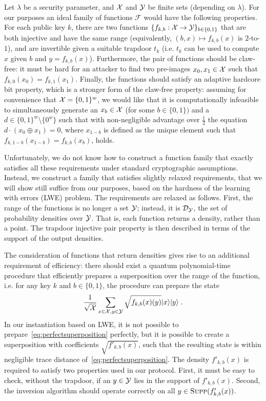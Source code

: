 
Let $\lambda$ be a security parameter, and $\mathcal{X}$ and $\mathcal{Y}$ be finite sets (depending on $\lambda$). For our purposes an ideal family of functions $\mathcal{F}$ would have the following properties. For each public key $k$, there are two functions $ \{f_{k,b}:\mathcal{X}\rightarrow \mathcal{Y}\}_{b\in\{0,1\}}$ that are both injective and have the same range (equivalently, $(b,x)\mapsto f_{k,b}(x)$ is $2$-to-$1$), and are invertible given a suitable trapdoor $t_k$ (i.e. $t_k$ can be used to compute $x$ given $b$ and $y=f_{k,b}(x)$). Furthermore, the pair of functions should be claw-free: it must be hard for an attacker to find two pre-images $x_0,x_1\in\mathcal{X}$ such that $f_{k,0}(x_0) = f_{k,1}(x_1)$. Finally, the functions should satisfy an adaptive hardcore bit property, which is a stronger form of the claw-free property: assuming for convenience that $\mathcal{X}= \{0,1\}^w$, we would like that it is computationally infeasible to simultaneously generate an $x_b\in\mathcal{X}$ (for some $b\in\{0,1\})$ and a $d\in \{0,1\}^w\setminus \{0^w\}$ such that with non-negligible advantage over $\frac{1}{2}$ the equation $d\cdot (x_0\oplus x_1)=0$, where $x_{1-b}$ is defined as the unique element such that $f_{k,1-b}(x_{1-b})=f_{k,b}(x_b)$, holds.  


Unfortunately, we do not know how to construct a function family that exactly satisfies all these requirements under standard cryptographic assumptions. Instead, we  construct a family that satisfies slightly relaxed requirements, that we will show still suffice from our purposes, based on the hardness of the learning with errors (LWE) problem. The requirements are relaxed as follows. First, the range of the functions is no longer a set $\mathcal{Y}$; instead, it is  $\mathcal{D}_{\mathcal{Y}}$, the set of probability densities over $\mathcal{Y}$. That is, each function returns a density, rather than a point. The trapdoor injective pair property is then described in terms of the support of the output densities. 

The consideration of functions that return densities gives rise to an additional requirement of efficiency: there should exist a quantum polynomial-time procedure that efficiently prepares a superposition over the range of the function, i.e. for any key $k$ and $b\in\{0,1\}$, the procedure can prepare the state
\begin{equation}\label{eq:perfectsuperposition}
\frac{1}{\sqrt{\mathcal{X}}}\sum_{x\in \mathcal{X}, y\in \mathcal{Y}}\sqrt{f_{k,b}(x)(y)}|x\rangle|y\rangle\;.
\end{equation}
In our instantiation based on LWE, it is not possible to prepare~\eqref{eq:perfectsuperposition} perfectly, but it is possible to create a superposition with coefficients $\sqrt{f'_{k,b}(x)}$, such that the resulting state is within negligible trace distance of~\eqref{eq:perfectsuperposition}. The density $f'_{k,b}(x)$ is required to satisfy two properties used in our protocol. First, it must be easy to check, without the trapdoor, if an $y\in \mathcal{Y}$ lies in the support of $f'_{k,b}(x)$. Second, the inversion algorithm should operate correctly on all $y\in\textsc{Supp} (f'_{k,b}(x))$.

